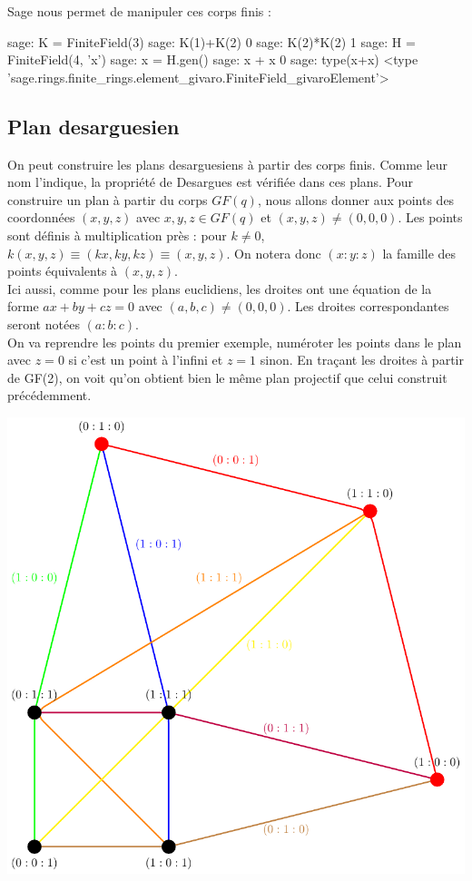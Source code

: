 \documentclass[a4paper]{article}
\begin{document}
\bigskip
Sage nous permet de manipuler ces corps finis :
\begin{sageverbatim}
 sage: K = FiniteField(3)
 sage: K(1)+K(2)
 0
 sage: K(2)*K(2)
 1
 sage: H = FiniteField(4, 'x')
 sage: x = H.gen()
 sage: x + x
 0
 sage: type(x+x)
 <type 'sage.rings.finite_rings.element_givaro.FiniteField_givaroElement'>
\end{sageverbatim}
\newpage

\subsection{Plan desarguesien}
On peut construire les plans desarguesiens à partir des corps finis. Comme leur nom l'indique, la propriété de Desargues est vérifiée dans ces plans.
Pour construire un plan à partir du corps $GF(q)$,
nous allons donner aux points des coordonnées $(x,y,z)$ avec $x,y,z \in GF(q)$ et $(x,y,z) \neq (0,0,0)$. Les points sont définis à multiplication près : pour $k \neq 0$, $k(x,y,z) \equiv (kx,ky,kz) \equiv (x,y,z)$. On notera donc $(x:y:z)$ la famille des points équivalents à $(x,y,z)$.\\
Ici aussi, comme pour les plans euclidiens, les droites ont une équation de la forme $ax + by + cz = 0$ avec $(a,b,c) \neq (0,0,0)$. Les droites correspondantes seront notées $(a:b:c)$.\\
On va reprendre les points du premier exemple, numéroter les points dans le plan avec $z=0$ si c'est un point à l'infini et $z=1$ sinon. En traçant les droites à partir de GF(2), on voit qu'on obtient bien le même plan projectif que celui construit précédemment. 
\begin{center}
  \includegraphics[scale=0.5]{droitestikz.pdf}
  \end{center}
\vspace{2\baselineskip}
\end{document}
